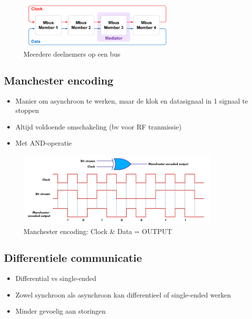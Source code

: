 \documentclass{article}
\begin{document}
\begin{figure}[H]
    \centering
    \includegraphics[width=0.7\textwidth]{Screenshot_20200323_122755.png}
    \caption{Meerdere deelnemers op een bus}
\end{figure}

\subsection{Manchester encoding}
\begin{itemize}
    \item Manier om asynchroon te werken, maar de klok en datasignaal in 1 signaal te stoppen
    \item Altijd voldoende omschakeling (bv voor RF tranmissie)
    \item Met AND-operatie
\end{itemize}

\begin{figure}[H]
    \centering
    \includegraphics[width=0.9\textwidth]{Screenshot_20200323_123031.png}
    \caption{Manchester encoding: Clock \& Data = OUTPUT}
\end{figure}

\subsection{Differentiele communicatie}
\begin{itemize}
    \item Differential vs single-ended
    \item Zowel synchroon als asynchroon kan differentieel of single-ended werken
    \item Minder gevoelig aan storingen
\end{itemize}
\end{document}
